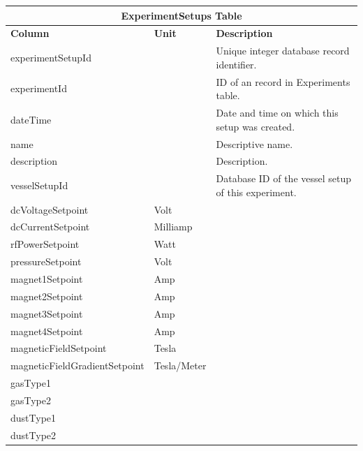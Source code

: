 \documentclass{sig-alternate}
\begin{document}
\begin{table}[h!]
\centering
\begin{tabular}{l l p{2.5cm}}
\multicolumn{3}{c}{\bf ExperimentSetups Table} \\ \hline
{\bf Column} & {\bf Unit} & {\bf Description}\\ \hline
experimentSetupId & & Unique integer database record identifier.\\ \hline
experimentId & & ID of an record in Experiments table.\\ \hline
dateTime & & Date and time on which this setup was created.\\ \hline
name & & Descriptive name.\\ \hline
description & & Description.\\ \hline
vesselSetupId & & Database ID of the vessel setup of this experiment.\\ \hline
dcVoltageSetpoint & Volt & \\ \hline
dcCurrentSetpoint & Milliamp & \\ \hline
rfPowerSetpoint & Watt & \\ \hline
pressureSetpoint & Volt & \\ \hline
magnet1Setpoint & Amp & \\ \hline
magnet2Setpoint & Amp & \\ \hline
magnet3Setpoint & Amp & \\ \hline
magnet4Setpoint & Amp & \\ \hline
magneticFieldSetpoint & Tesla & \\ \hline
magneticFieldGradientSetpoint & Tesla/Meter & \\ \hline
gasType1 && \\ \hline
gasType2 && \\ \hline
dustType1 && \\ \hline
dustType2 && \\ \hline
\end{tabular}
\end{table}
\end{document}

